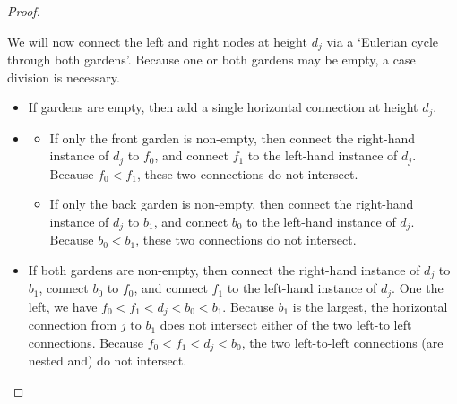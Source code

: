 \documentclass[12pt]{amsart}
\theoremstyle{plain}
\theoremstyle{definition} \newtheorem{definition}[theorem]{Definition}
\theoremstyle{plain}
\theoremstyle{plain} \newtheorem{proposition}[theorem]{Proposition}
\theoremstyle{plain} \newtheorem{conjecture}[theorem]{Conjecture}
\theoremstyle{plain} \newtheorem{corollary}[theorem]{Corollary}
\theoremstyle{remark} \newtheorem{claim}[theorem]{Claim}
\theoremstyle{remark} \newtheorem{remark}[theorem]{Remark}
\theoremstyle{remark} \newtheorem{example}[theorem]{Example}
\theoremstyle{remark} \newtheorem{comment}[theorem]{Comment}
\theoremstyle{definition} \newtheorem{question}[theorem]{Question}
\begin{document}
\begin{proof}
\begin{center}
\quad
\end{center}

We will now connect the left and right nodes at height $d_j$ via a `Eulerian cycle through both gardens'. Because one or both gardens may be empty, a case division is necessary.

\begin{itemize}
    \item If gardens are empty, then add a single horizontal connection at height $d_j$.
    \item \begin{itemize}
    \item If only the front garden is non-empty, then connect the right-hand instance of $d_j$ to $f_0$, and connect $f_1$ to the left-hand instance of $d_j$. Because $f_0 < f_1$, these two connections do not intersect.
    \item If only the back garden is non-empty, then connect the right-hand instance of $d_j$ to $b_1$, and connect $b_0$ to the left-hand instance of $d_j$. Because $b_0 < b_1$, these two connections do not intersect.
\end{itemize}
    \item If both gardens are non-empty, then connect the right-hand instance of $d_j$ to $b_1$, connect $b_0$ to $f_0$, and connect $f_1$ to the left-hand instance of $d_j$. One the left, we have $f_0 < f_1 < d_j < b_0 < b_1$. Because $b_1$ is the largest, the horizontal connection from $j$ to $b_1$ does not intersect either of the two left-to left connections. Because $f_0 < f_1 < d_j < b_0$, the two left-to-left connections (are nested and) do not intersect.
\end{itemize}


\end{proof}
\end{document}

